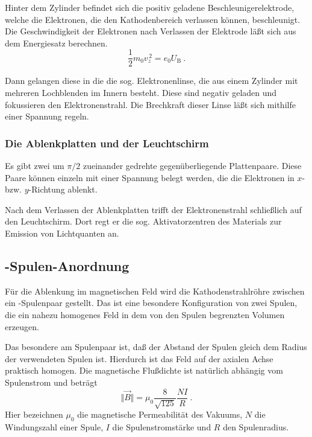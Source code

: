 Hinter dem Zylinder befindet sich die positiv geladene
Beschleunigerelektrode, welche die Elektronen, die den Kathodenbereich
verlassen können, beschleunigt. Die Geschwindigkeit der Elektronen nach
Verlassen der Elektrode läßt sich aus dem Energiesatz berechnen.
%
\begin{equation}
  \label{eq:acc-volt-vel-z}
  \frac{1}{2} m_0 v_z^{\,2} = e_0 U_\text{B} \:.
\end{equation}

Dann gelangen diese in die die sog. Elektronenlinse, die aus einem Zylinder mit
mehreren Lochblenden im Innern besteht. Diese sind negativ geladen und
fokussieren den Elektronenstrahl. Die Brechkraft dieser Linse läßt sich
mithilfe einer Spannung regeln.

\subsubsection{Die Ablenkplatten und der Leuchtschirm}

Es gibt zwei um $\pi/2$ zueinander gedrehte gegenüberliegende
Plattenpaare. Diese Paare können einzeln mit einer Spannung belegt
werden, die die Elektronen in $x$- bzw. $y$-Richtung ablenkt.

Nach dem Verlassen der Ablenkplatten trifft der Elektronenstrahl
schließlich auf den Leuchtschirm. Dort regt er die sog. Aktivatorzentren
des Materials zur Emission von Lichtquanten an.

\subsection{-Spulen-Anordnung}

Für die Ablenkung im magnetischen Feld wird die Kathodenstrahlröhre
zwischen ein -Spulenpaar gestellt. Das ist eine
besondere Konfiguration von zwei Spulen, die ein nahezu homogenes Feld
in dem von den Spulen begrenzten Volumen erzeugen.

Das besondere am Spulenpaar ist, daß der Abstand der Spulen gleich dem
Radius der verwendeten Spulen ist. Hierdurch ist das Feld auf der
axialen Achse praktisch homogen. Die magnetische Flußdichte ist
natürlich abhängig vom Spulenstrom und beträgt
%
\begin{equation}
  \label{eq:mag-force-helmholtz}
  \Vert\vec{B}\Vert = \mu_0 \frac{8}{\sqrt{125}} \frac{NI}{R} \:.
\end{equation}
%
Hier bezeichnen $\mu_0$ die magnetische Permeabilität des Vakuums, $N$
die Windungszahl einer Spule, $I$ die Spulenstromstärke und $R$ den
Spulenradius.

